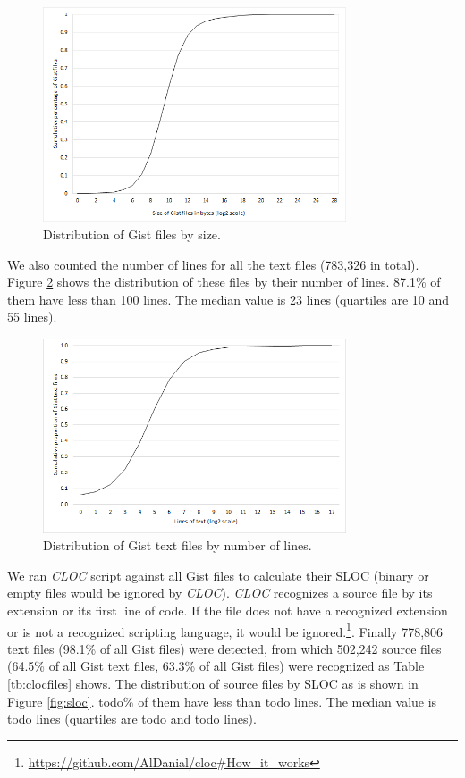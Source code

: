 \begin{figure}[!htb]
	\centering
	\includegraphics[width=0.8\textwidth]{figures/gist_file_size_log.png}
	\caption{Distribution of Gist files by size.}
	\label{fig:size}
\end{figure}

We also counted the number of lines for all the text files (783,326 in total). Figure \ref{fig:textlines} shows the distribution of these files by their number of lines. 87.1\% of them have less than 100 lines. The median value is 23 lines (quartiles are 10 and 55 lines).

\begin{figure}[!htb]
	\centering
	\includegraphics[width=0.8\textwidth]{figures/text_files_lines.png}
	\caption{Distribution of Gist text files by number of lines.}
	\label{fig:textlines}
\end{figure}

We ran \textit{CLOC} script against all Gist files to calculate their SLOC (binary or empty files would be ignored by \textit{CLOC}). \textit{CLOC} recognizes a source file by its extension or its first line of code. If the file does not have a recognized extension or is not a recognized scripting language, it would be ignored.\footnote{\url{https://github.com/AlDanial/cloc\#How_it_works}}. Finally 778,806 text files (98.1\% of all Gist files) were detected, from which 502,242 source files (64.5\% of all Gist text files, 63.3\% of all Gist files) were recognized as Table \ref{tb:clocfiles} shows. The distribution of source files by SLOC as is shown in Figure \ref{fig:sloc}. todo\% of them have less than todo lines. The median value is todo lines (quartiles are todo and todo lines).

